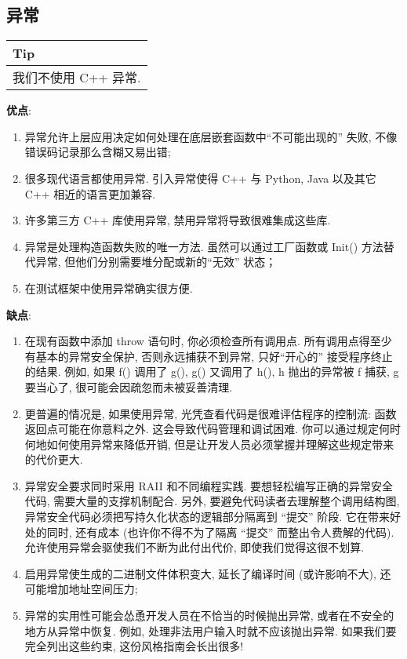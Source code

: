 \documentclass[a4paper,11pt,CJK]{article}
\begin{document}
\begin{CJK}{UTF8}{gbsn}
\subsection{异常}
\begin{table}[htbp]
\flushleft
\begin{tabular}{p{400pt}}
\toprule
\rowcolor[gray]{.8} Tip \\
\midrule
我们不使用 C++ 异常.\\
\bottomrule
\end{tabular}
\end{table}
\noindent
\textbf{优点}:
\begin{enumerate}
\item
异常允许上层应用决定如何处理在底层嵌套函数中``不可能出现的'' 失败, 不像错误码记录那么含糊又易出错;
\item
很多现代语言都使用异常. 引入异常使得 C++ 与 Python, Java 以及其它 C++ 相近的语言更加兼容.
\item
许多第三方 C++ 库使用异常, 禁用异常将导致很难集成这些库.
\item
异常是处理构造函数失败的唯一方法. 虽然可以通过工厂函数或 Init() 方法替代异常, 但他们分别需要堆分配或新的``无效'' 状态；
\item
在测试框架中使用异常确实很方便.
\end{enumerate}
\textbf{缺点}:
\begin{enumerate}
\item
在现有函数中添加 throw 语句时, 你必须检查所有调用点. 所有调用点得至少有基本的异常安全保护, 否则永远捕获不到异常, 只好``开心的'' 接受程序终止的结果. 例如, 如果 f() 调用了 g(), g() 又调用了 h(), h 抛出的异常被 f 捕获, g 要当心了, 很可能会因疏忽而未被妥善清理.
\item
更普遍的情况是, 如果使用异常, 光凭查看代码是很难评估程序的控制流: 函数返回点可能在你意料之外. 这会导致代码管理和调试困难. 你可以通过规定何时何地如何使用异常来降低开销, 但是让开发人员必须掌握并理解这些规定带来的代价更大.
\item
异常安全要求同时采用 RAII 和不同编程实践. 要想轻松编写正确的异常安全代码, 需要大量的支撑机制配合. 另外, 要避免代码读者去理解整个调用结构图, 异常安全代码必须把写持久化状态的逻辑部分隔离到 “提交” 阶段. 它在带来好处的同时, 还有成本 (也许你不得不为了隔离 ``提交'' 而整出令人费解的代码). 允许使用异常会驱使我们不断为此付出代价, 即使我们觉得这很不划算.
\item
启用异常使生成的二进制文件体积变大, 延长了编译时间 (或许影响不大), 还可能增加地址空间压力;
\item
异常的实用性可能会怂恿开发人员在不恰当的时候抛出异常, 或者在不安全的地方从异常中恢复. 例如, 处理非法用户输入时就不应该抛出异常. 如果我们要完全列出这些约束, 这份风格指南会长出很多!

\end{enumerate}
\end{CJK}
\end{document}
